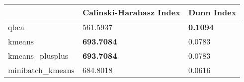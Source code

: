 \begin{table}[htbp]
\centering
\begin{tabular}{lll}
\toprule
 & Calinski-Harabasz Index & Dunn Index \\
\midrule
qbca & 561.5937 & \textbf{0.1094} \\
kmeans & \textbf{693.7084} & 0.0783 \\
kmeans_plusplus & \textbf{693.7084} & 0.0783 \\
minibatch_kmeans & 684.8018 & 0.0616 \\
\bottomrule
\end{tabular}
\end{table}
